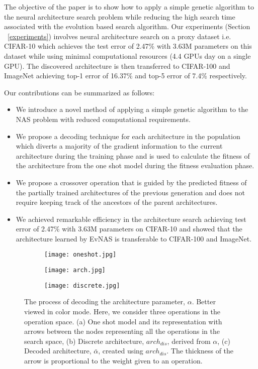 \documentclass[final]{cvpr}
\begin{document}
The objective of the paper is to show how to apply a simple genetic algorithm to the
neural architecture search problem while reducing the high search time associated with 
the evolution based search algorithm. Our experiments (Section ~\ref{experiments}) involves
neural architecture search on a proxy dataset i.e. CIFAR-10 which achieves the
test error of 2.47\% with 3.63M parameters on this dataset while using minimal computational
resources (4.4 GPUs day on a single GPU). The discovered architecture is then transferred to
CIFAR-100 and ImageNet achieving top-1 error of 16.37\% and top-5 error of 7.4\%
respectively.

Our contributions can be summarized as follows:
\begin{itemize}
    \item We introduce a novel method of applying a simple genetic algorithm to the NAS problem with
    reduced computational requirements.
    \item We propose a decoding technique for each architecture in the population which diverts a
    majority of the gradient information to the current architecture during the training phase and is
    used to calculate the fitness of the architecture from the one shot model during the fitness
    evaluation phase.
    \item We propose a crossover operation that is guided by the predicted fitness of the partially
    trained architectures of the previous generation and does not require keeping track of the
    ancestors of the parent architectures.
    \item We achieved remarkable efficiency in the architecture search achieving
    test error of 2.47\% with 3.63M parameters on CIFAR-10 and showed that the architecture
    learned by EvNAS is transferable to CIFAR-100 and ImageNet.
\end{itemize}

\begin{figure*}
  \centering
\begin{subfigure}{0.34\linewidth}
    \texttt{[image: oneshot.jpg]}
    \caption{}
    \label{subfig:darts}
  \end{subfigure}
  \quad
  \begin{subfigure}{0.18\linewidth}
    \texttt{[image: arch.jpg]}
    \caption{}
    \label{subfig:discrete_arch}
  \end{subfigure}
  \quad
  \begin{subfigure}{0.38\linewidth}
    \texttt{[image: discrete.jpg]}
    \caption{}
    \label{subfig:decoded_arch}
  \end{subfigure}
  \caption{The process of decoding the architecture parameter, $\alpha$. Better viewed in
  color mode. Here, we consider three operations in the operation space.
  (a) One shot model and its representation with arrows between the nodes
  representing all the operations in the search space,
  (b) Discrete architecture, $arch_{dis}$, derived from $\alpha$,
  (c) Decoded architecture, $\bar{\alpha}$, created using $arch_{dis}$.
  The thickness of the arrow is proportional to the weight given to an operation.}
  \label{fig:arch_represent}
\end{figure*}
\end{document}

